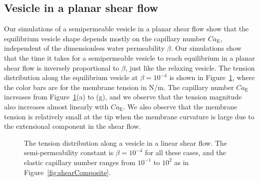 \documentclass[9pt,twocolumn,twoside,lineno]{pnas-new}
\begin{document}
\subsection*{Vesicle in a planar shear flow}
Our simulations of a semipermeable vesicle in a planar shear flow show
that the equilibrium vesicle shape depends mostly on the capillary
number $Ca_\mathrm{E}$, independent of the dimensionless water
permeability $\beta$. Our simulations show that the time it takes for a
semipermeable vesicle to reach equilibrium in a planar shear flow is
inversely proportional to $\beta$, just like the relaxing vesicle. The
tension distribution along the equilibrium vesicle at $\beta=10^{-4}$ is
shown in Figure~\ref{fig:shearTensions}, where the color bars are for
the membrane tension in N/m. The capillary number $Ca_\mathrm{E}$
increases from Figure~\ref{fig:shearTensions}(a) to (g), and we observe
that the tension magnitude also increases almost linearly with
$Ca_\mathrm{E}$. We also observe that the membrane tension is relatively
small at the tip when the membrane curvature is large due to the
extensional component in the shear flow.
\begin{figure}[hbp]
  \caption{\label{fig:shearTensions} The tension distribution along a
  vesicle in a linear shear flow. The semi-permeability constant is
  $\beta = 10^{-4}$ for all these cases, and the elastic capillary
  number ranges from $10^{-1}$ to $10^{2}$ as in
  Figure~\ref{fig:shearComposite}.}
\end{figure}
\end{document}
